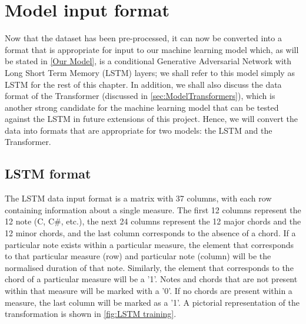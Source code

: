 


\section{Model input format}
\label{Model input format}
Now that the dataset has been pre-processed, it can now be converted into a format that is appropriate for input to our machine learning model which, as will be stated in \cref{Our Model}, is a conditional Generative Adversarial Network with Long Short Term Memory (LSTM) layers; we shall refer to this model simply as LSTM for the rest of this chapter. In addition, we shall also discuss the data format of the Transformer (discussed in \cref{sec:ModelTransformers}), which is another strong candidate for the machine learning model that can be tested against the LSTM in future extensions of this project. Hence, we will convert the data into formats that are appropriate for two models: the LSTM and the Transformer.

\subsection{LSTM format}
\label{LSTM format for training}
The LSTM data input format is a matrix with 37 columns, with each row containing information about a single measure. The first 12 columns represent the 12 note (C, C\#, etc.), the next 24 columns represent the 12 major chords and the 12 minor chords, and the last column corresponds to the absence of a chord. If a particular note exists within a particular measure, the element that corresponds to that particular measure (row) and particular note (column) will be the normalised duration of that note. Similarly, the element that corresponds to the chord of a particular measure will be a '1'. Notes and chords that are not present within that measure will be marked with a '0'. If no chords are present within a measure, the last column will be marked as a '1'. A pictorial representation of the transformation is shown in \cref{fig:LSTM training}.

